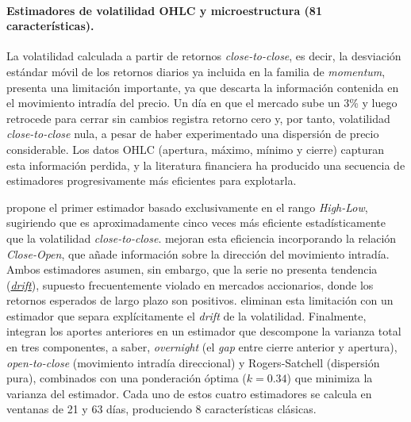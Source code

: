 \paragraph{Estimadores de volatilidad OHLC y microestructura (81 caracter\'isticas).}
La volatilidad calculada a partir de retornos \textit{close-to-close}, es decir, la desviaci\'on est\'andar m\'ovil de los retornos diarios ya incluida en la familia de \textit{momentum}, presenta una limitaci\'on importante, ya que descarta la informaci\'on contenida en el movimiento intrad\'ia del precio. Un d\'ia en que el mercado sube un 3\% y luego retrocede para cerrar sin cambios registra retorno cero y, por tanto, volatilidad \textit{close-to-close} nula, a pesar de haber experimentado una dispersi\'on de precio considerable. Los datos OHLC (apertura, m\'aximo, m\'inimo y cierre) capturan esta informaci\'on perdida, y la literatura financiera ha producido una secuencia de estimadores progresivamente m\'as eficientes para explotarla.

\citet{parkinson1980} propone el primer estimador basado exclusivamente en el rango \textit{High-Low}, sugiriendo que es aproximadamente cinco veces m\'as eficiente estad\'isticamente que la volatilidad \textit{close-to-close}. \citet{garman1980} mejoran esta eficiencia incorporando la relaci\'on \textit{Close-Open}, que a\~nade informaci\'on sobre la direcci\'on del movimiento intrad\'ia. Ambos estimadores asumen, sin embargo, que la serie no presenta tendencia (\hyperlink{glos:drift}{\textit{drift}}), supuesto frecuentemente violado en mercados accionarios, donde los retornos esperados de largo plazo son positivos. \citet{rogers1991} eliminan esta limitaci\'on con un estimador que separa expl\'icitamente el \textit{drift} de la volatilidad. Finalmente, \citet{yang2000} integran los aportes anteriores en un estimador que descompone la varianza total en tres componentes, a saber, \textit{overnight} (el \textit{gap} entre cierre anterior y apertura), \textit{open-to-close} (movimiento intrad\'ia direccional) y Rogers-Satchell (dispersi\'on pura), combinados con una ponderaci\'on \'optima ($k = 0.34$) que minimiza la varianza del estimador. Cada uno de estos cuatro estimadores se calcula en ventanas de 21 y 63 d\'ias, produciendo 8 caracter\'isticas cl\'asicas.

